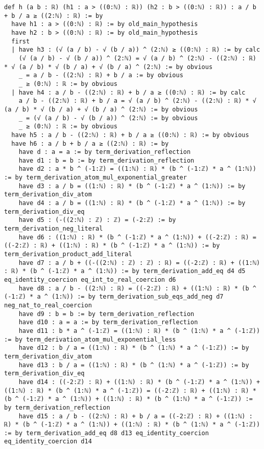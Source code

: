 \documentclass{article}
\begin{document}
\begin{tcolorbox}[colback=white!10, width=\linewidth]
\begin{lstlisting}[language=Lean4]
def h (a b : ℝ) (h1 : a > ((0:ℕ) : ℝ)) (h2 : b > ((0:ℕ) : ℝ)) : a / b + b / a ≥ ((2:ℕ) : ℝ) := by
  have h1 : a > ((0:ℕ) : ℝ) := by old_main_hypothesis
  have h2 : b > ((0:ℕ) : ℝ) := by old_main_hypothesis
  first
  | have h3 : (√ (a / b) - √ (b / a)) ^ (2:ℕ) ≥ ((0:ℕ) : ℝ) := by calc
    (√ (a / b) - √ (b / a)) ^ (2:ℕ) = √ (a / b) ^ (2:ℕ) - ((2:ℕ) : ℝ) * √ (a / b) * √ (b / a) + √ (b / a) ^ (2:ℕ) := by obvious
    _ = a / b - ((2:ℕ) : ℝ) + b / a := by obvious
    _ ≥ (0:ℕ) : ℝ := by obvious
  | have h4 : a / b - ((2:ℕ) : ℝ) + b / a ≥ ((0:ℕ) : ℝ) := by calc
    a / b - ((2:ℕ) : ℝ) + b / a = √ (a / b) ^ (2:ℕ) - ((2:ℕ) : ℝ) * √ (a / b) * √ (b / a) + √ (b / a) ^ (2:ℕ) := by obvious
    _ = (√ (a / b) - √ (b / a)) ^ (2:ℕ) := by obvious
    _ ≥ (0:ℕ) : ℝ := by obvious
  have h5 : a / b - ((2:ℕ) : ℝ) + b / a ≥ ((0:ℕ) : ℝ) := by obvious
  have h6 : a / b + b / a ≥ ((2:ℕ) : ℝ) := by
    have d : a = a := by term_derivation_reflection
    have d1 : b = b := by term_derivation_reflection
    have d2 : a * b ^ (-1:ℤ) = ((1:ℕ) : ℝ) * (b ^ (-1:ℤ) * a ^ (1:ℕ)) := by term_derivation_atom_mul_exponential_greater
    have d3 : a / b = ((1:ℕ) : ℝ) * (b ^ (-1:ℤ) * a ^ (1:ℕ)) := by term_derivation_div_atom
    have d4 : a / b = ((1:ℕ) : ℝ) * (b ^ (-1:ℤ) * a ^ (1:ℕ)) := by term_derivation_div_eq
    have d5 : (-((2:ℕ) : ℤ) : ℤ) = (-2:ℤ) := by term_derivation_neg_literal
    have d6 : ((1:ℕ) : ℝ) * (b ^ (-1:ℤ) * a ^ (1:ℕ)) + ((-2:ℤ) : ℝ) = ((-2:ℤ) : ℝ) + ((1:ℕ) : ℝ) * (b ^ (-1:ℤ) * a ^ (1:ℕ)) := by term_derivation_product_add_literal
    have d7 : a / b + ((-((2:ℕ) : ℤ) : ℤ) : ℝ) = ((-2:ℤ) : ℝ) + ((1:ℕ) : ℝ) * (b ^ (-1:ℤ) * a ^ (1:ℕ)) := by term_derivation_add_eq d4 d5 eq_identity_coercion eq_int_to_real_coercion d6
    have d8 : a / b - ((2:ℕ) : ℝ) = ((-2:ℤ) : ℝ) + ((1:ℕ) : ℝ) * (b ^ (-1:ℤ) * a ^ (1:ℕ)) := by term_derivation_sub_eqs_add_neg d7 neg_nat_to_real_coercion
    have d9 : b = b := by term_derivation_reflection
    have d10 : a = a := by term_derivation_reflection
    have d11 : b * a ^ (-1:ℤ) = ((1:ℕ) : ℝ) * (b ^ (1:ℕ) * a ^ (-1:ℤ)) := by term_derivation_atom_mul_exponential_less
    have d12 : b / a = ((1:ℕ) : ℝ) * (b ^ (1:ℕ) * a ^ (-1:ℤ)) := by term_derivation_div_atom
    have d13 : b / a = ((1:ℕ) : ℝ) * (b ^ (1:ℕ) * a ^ (-1:ℤ)) := by term_derivation_div_eq
    have d14 : ((-2:ℤ) : ℝ) + ((1:ℕ) : ℝ) * (b ^ (-1:ℤ) * a ^ (1:ℕ)) + ((1:ℕ) : ℝ) * (b ^ (1:ℕ) * a ^ (-1:ℤ)) = ((-2:ℤ) : ℝ) + ((1:ℕ) : ℝ) * (b ^ (-1:ℤ) * a ^ (1:ℕ)) + ((1:ℕ) : ℝ) * (b ^ (1:ℕ) * a ^ (-1:ℤ)) := by term_derivation_reflection
    have d15 : a / b - ((2:ℕ) : ℝ) + b / a = ((-2:ℤ) : ℝ) + ((1:ℕ) : ℝ) * (b ^ (-1:ℤ) * a ^ (1:ℕ)) + ((1:ℕ) : ℝ) * (b ^ (1:ℕ) * a ^ (-1:ℤ)) := by term_derivation_add_eq d8 d13 eq_identity_coercion eq_identity_coercion d14

\end{lstlisting}
\end{tcolorbox}
\end{document}
